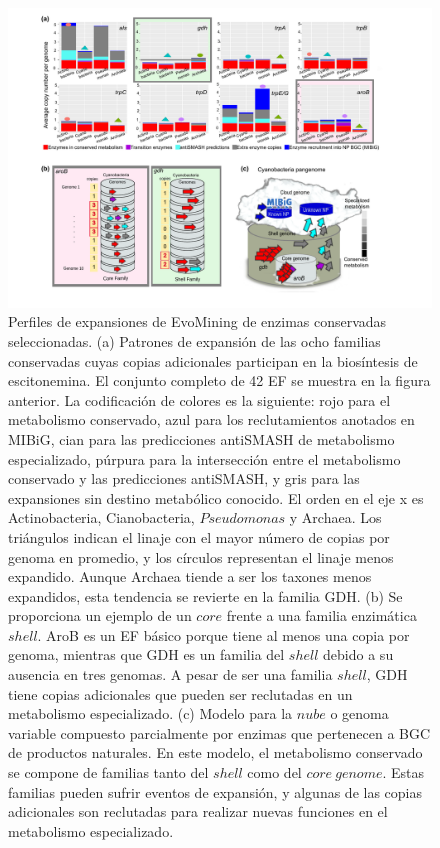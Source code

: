 \documentclass[12pt,twoside]{reedthesis}
\begin{document}
  \begin{figure}[h!tbp]
  \centering
  \includegraphics[angle = 0,scale = .6]{chapter2/FigurasPaper/Figure3.pdf}
  \caption[Patrones de expansión de familias que participan en la síntesis de escitonemina]{\footnotesize{Perfiles de expansiones de EvoMining de enzimas conservadas seleccionadas. (a) Patrones de expansión de las ocho familias conservadas cuyas copias adicionales participan en la biosíntesis de escitonemina. El conjunto completo de 42 EF se muestra en la figura anterior. La codificación de colores es la siguiente: rojo para el metabolismo conservado, azul para los reclutamientos anotados en MIBiG, cian para las predicciones antiSMASH de metabolismo especializado, púrpura para la intersección entre el metabolismo conservado y las predicciones antiSMASH, y gris para las expansiones sin destino metabólico conocido. El orden en el eje x es Actinobacteria, Cianobacteria, $Pseudomonas$ y Archaea. Los triángulos indican el linaje con el mayor número de copias por genoma en promedio, y los círculos representan el linaje menos expandido. Aunque Archaea tiende a ser los taxones menos expandidos, esta tendencia se revierte en la familia GDH. (b) Se proporciona un ejemplo de un $core$ frente a una familia enzimática $shell$. AroB es un EF básico porque tiene al menos una copia por genoma, mientras que GDH es un familia del $shell$ debido a su ausencia en tres genomas. A pesar de ser una familia $shell$, GDH tiene copias adicionales que pueden ser reclutadas en un metabolismo especializado. (c) Modelo para la $nube$ o genoma variable compuesto parcialmente por enzimas que pertenecen a BGC de productos naturales. En este modelo, el metabolismo conservado se compone de familias tanto del $shell$ como del $core~genome$. Estas familias pueden sufrir eventos de expansión, y algunas de las copias adicionales son reclutadas para realizar nuevas funciones en el metabolismo especializado.}}
  \label{fig:ExpansionPatterns}
  \end{figure}
  
\end{document}
